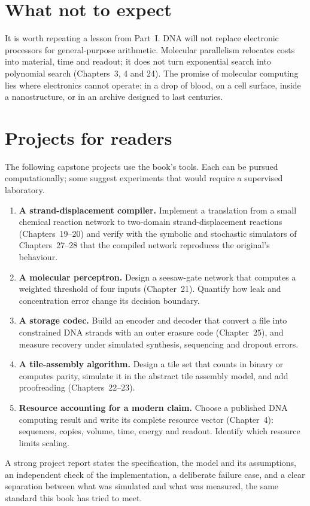 \section*{What not to expect}
It is worth repeating a lesson from Part~I. DNA will not replace electronic
processors for general-purpose arithmetic. Molecular parallelism relocates
costs into material, time and readout; it does not turn exponential search into
polynomial search (Chapters~3, 4 and 24). The promise of molecular computing
lies where electronics cannot operate: in a drop of blood, on a cell surface,
inside a nanostructure, or in an archive designed to last centuries.

\section*{Projects for readers}
The following capstone projects use the book's tools. Each can be pursued
computationally; some suggest experiments that would require a supervised
laboratory.
\begin{enumerate}
\item \textbf{A strand-displacement compiler.} Implement a translation from a
small chemical reaction network to two-domain strand-displacement reactions
(Chapters~19--20) and verify with the symbolic and stochastic simulators of
Chapters~27--28 that the compiled network reproduces the original's behaviour.
\item \textbf{A molecular perceptron.} Design a seesaw-gate network that
computes a weighted threshold of four inputs (Chapter~21). Quantify how leak and
concentration error change its decision boundary.
\item \textbf{A storage codec.} Build an encoder and decoder that convert a
file into constrained DNA strands with an outer erasure code (Chapter~25), and
measure recovery under simulated synthesis, sequencing and dropout errors.
\item \textbf{A tile-assembly algorithm.} Design a tile set that counts in
binary or computes parity, simulate it in the abstract tile assembly model, and
add proofreading (Chapters~22--23).
\item \textbf{Resource accounting for a modern claim.} Choose a published DNA
computing result and write its complete resource vector (Chapter~4): sequences,
copies, volume, time, energy and readout. Identify which resource limits scaling.
\end{enumerate}
A strong project report states the specification, the model and its
assumptions, an independent check of the implementation, a deliberate failure
case, and a clear separation between what was simulated and what was measured,
the same standard this book has tried to meet.

